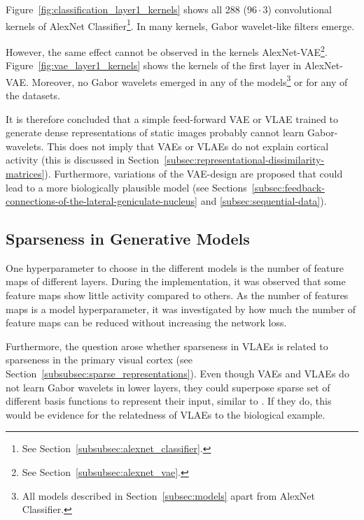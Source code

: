 Figure~\ref{fig:classification_layer1_kernels} shows all 288 ($96 \cdot 3$) convolutional kernels of AlexNet Classifier\footnote{See Section~\ref{subsubsec:alexnet_classifier}.}.
In many kernels, Gabor wavelet-like filters emerge.

However, the same effect cannot be observed in the kernels AlexNet-\ac{VAE}\footnote{See Section~\ref{subsubsec:alexnet_vae}.}.
Figure~\ref{fig:vae_layer1_kernels} shows the kernels of the first layer in AlexNet-\ac{VAE}.
Moreover, no Gabor wavelets emerged in any of the models\footnote{All models described in Section~\ref{subsec:models} apart from AlexNet Classifier.} or for any of the datasets.

It is therefore concluded that a simple feed-forward \ac{VAE} or \ac{VLAE} trained to generate dense representations of static images probably cannot learn Gabor-wavelets.
This does not imply that \acp{VAE} or \acp{VLAE} do not explain cortical activity (this is discussed in Section~\ref{subsec:representational-dissimilarity-matrices}).
Furthermore, variations of the \ac{VAE}-design are proposed that could lead to a more biologically plausible model (see Sections~\ref{subsec:feedback-connections-of-the-lateral-geniculate-nucleus} and \ref{subsec:sequential-data}).


\subsection{Sparseness in Generative Models}\label{subsec:effective-network-capacity}
One hyperparameter to choose in the different models is the number of feature maps of different layers.
During the implementation, it was observed that some feature maps show little activity compared to others.
As the number of features maps is a model hyperparameter, it was investigated by how much the number of feature maps can be reduced without increasing the network loss.

Furthermore, the question arose whether sparseness in \acp{VLAE} is related to sparseness in the primary visual cortex (see Section~\ref{subsubsec:sparse_representations}).
Even though \acp{VAE} and \acp{VLAE} do not learn Gabor wavelets in lower layers, they could superpose sparse set of different basis functions to represent their input, similar to \citet{Olshausen1996}.
If they do, this would be evidence for the relatedness of \acp{VLAE} to the biological example.

